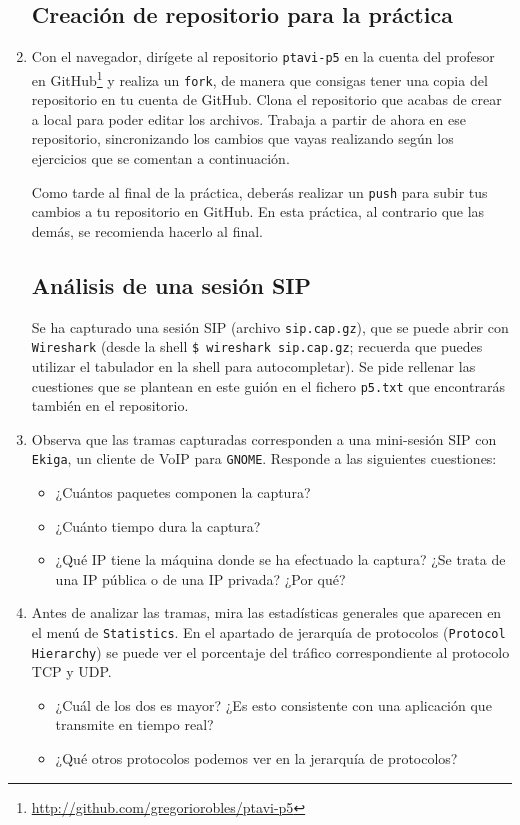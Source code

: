 \documentclass[11pt,a4paper]{article}
\begin{document}
\begin{enumerate}

\subsection*{Creación de repositorio para la práctica}

  \item Con el navegador, dirígete al repositorio \texttt{ptavi-p5} en la cuenta del profesor en GitHub\footnote{\url{http://github.com/gregoriorobles/ptavi-p5}} y realiza un \texttt{fork}, de manera que consigas tener una copia del repositorio en tu cuenta de GitHub. Clona el repositorio que acabas de crear a local para poder editar los archivos. Trabaja a partir de ahora en ese repositorio, sincronizando los cambios que vayas realizando según los ejercicios que se comentan a continuación.

  Como tarde al final de la práctica, deberás realizar un \texttt{push} para subir tus cambios a tu repositorio en GitHub. En esta práctica, al contrario que las demás, se recomienda hacerlo al final.


\subsection*{Análisis de una sesión SIP}

Se ha capturado una sesión SIP (archivo \texttt{sip.cap.gz}), que se puede abrir con \texttt{Wireshark} (desde la shell \texttt{\$ wireshark sip.cap.gz}; recuerda que puedes utilizar el tabulador en la shell para autocompletar). Se pide rellenar las cuestiones que se plantean en este guión en el fichero \texttt{p5.txt} que encontrarás también en el repositorio. 

  \item Observa que las tramas capturadas corresponden a una mini-sesión SIP con \texttt{Ekiga}, un cliente de VoIP para \texttt{GNOME}. Responde a las siguientes cuestiones:
  \begin{itemize}
    \item ¿Cuántos paquetes componen la captura?
    \item ¿Cuánto tiempo dura la captura?
    \item ¿Qué IP tiene la máquina donde se ha efectuado la captura? ¿Se trata de una IP pública o de una IP privada? ¿Por qué?
  \end{itemize}

  \item Antes de analizar las tramas, mira las estadísticas generales que aparecen en el menú de \texttt{Statistics}. En el apartado de jerarquía de protocolos (\texttt{Protocol Hierarchy}) se puede ver el porcentaje del tráfico correspondiente al protocolo TCP y UDP.
  \begin{itemize}
    \item ¿Cuál de los dos es mayor? ¿Es esto consistente con una aplicación que transmite en tiempo real? 
    \item ¿Qué otros protocolos podemos ver en la jerarquía de protocolos?
  \end{itemize}


\end{enumerate}
\end{document}
